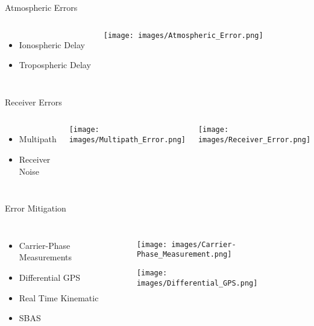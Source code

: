 \documentclass[12pt, compress, xcolor=table]{beamer}
\begin{document}
\begin{frame}{Atmospheric Errors}
 \begin{columns}
  \begin{itemize}
  \setlength\itemsep{0.5cm}
   \item Ionospheric Delay
   \item Tropospheric Delay
  \end{itemize}

  \texttt{[image: images/Atmospheric\_Error.png]}
  
 \end{columns}
\end{frame}

\begin{frame}{Receiver Errors}
 \begin{columns}
  \begin{itemize}
  \setlength\itemsep{0.5cm}
   \item Multipath
   \item Receiver Noise
  \end{itemize}

  \texttt{[image: images/Multipath\_Error.png]}
  
  \hspace{1cm}
  
  \texttt{[image: images/Receiver\_Error.png]}
  
 \end{columns}
\end{frame}

\begin{frame}{Error Mitigation}
  \begin{columns}
  \begin{itemize}
  \setlength\itemsep{0.5cm}
   \item Carrier-Phase Measurements
   \item Differential GPS
   \item Real Time Kinematic
   \item SBAS
  \end{itemize}

  \begin{figure}
   \texttt{[image: images/Carrier-Phase\_Measurement.png]}
  
  \texttt{[image: images/Differential\_GPS.png]}
  \end{figure}   
  
 \end{columns}
\end{frame}
\end{document}

